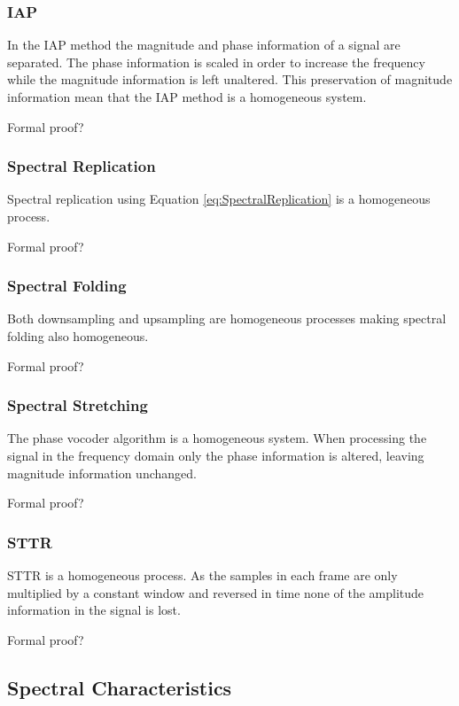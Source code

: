 		\subsubsection*{IAP}
			In the IAP method the magnitude and phase information of a signal are separated. The phase
			information is scaled in order to increase the frequency while the magnitude information is left
			unaltered. This preservation of magnitude information mean that the IAP method is a homogeneous
			system.

			\note
			{
				Formal proof?
			}

		\subsubsection*{Spectral Replication}
			Spectral replication using Equation \ref{eq:SpectralReplication} is a homogeneous process.

			\note
			{
				Formal proof?
			}
			
		\subsubsection*{Spectral Folding}
			Both downsampling and upsampling are homogeneous processes making spectral folding also
			homogeneous.

			\note
			{
				Formal proof?
			}
			
		\subsubsection*{Spectral Stretching}
			The phase vocoder algorithm is a homogeneous system. When processing the signal in the frequency
			domain only the phase information is altered, leaving magnitude information unchanged. 

			\note
			{
				Formal proof?
			}

		\subsubsection*{STTR}
			STTR is a homogeneous process. As the samples in each frame are only multiplied
			by a constant window and reversed in time none of the amplitude information in the signal is lost. 

			\note
			{
				Formal proof?
			}

	\subsection{Spectral Characteristics}
	\label{sec:ExcitationEvaluation-Comparison-SpectralCharacteristics}
